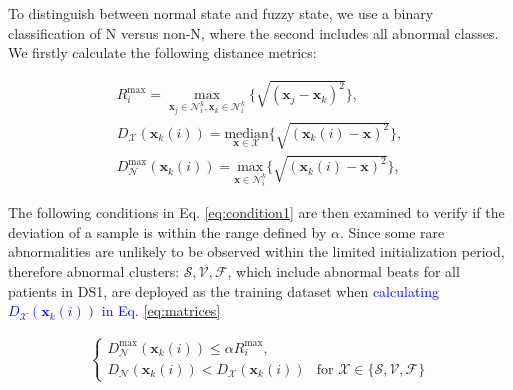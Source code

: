 To distinguish between normal state and fuzzy state, we use a binary classification of N versus non-N, where the second includes all abnormal classes. We firstly calculate the following distance metrics:

\begin{align}
R_i^{\max}=\underset{\mathbf{x}_j\in\mathcal{N}_i^k,\mathbf{x}_k\in\mathcal{N}_i^k}{\max}\{\sqrt{(\mathbf{x}_j-\mathbf{x}_k)^2}\},\\
\label{eq:matrices}
D_\mathcal{X}(\mathbf{x}_k(i))=\underset{\mathbf{x} \in\mathcal{X}}{\text{median}}\{\sqrt{(\mathbf{x}_k(i)-\mathbf{x})^2}\},
\\
D_\mathcal{N}^{\max}(\mathbf{x}_k(i))=\underset{\mathbf{x} \in\mathcal{N}_i^k}{\text{max}}\{\sqrt{(\mathbf{x}_k(i)-\mathbf{x})^2}\},
\end{align}

The following conditions in Eq. \ref{eq:condition1} are then examined to verify if the deviation of a sample is within the range defined by $\alpha$. Since some rare abnormalities are unlikely to be observed within the limited initialization period, therefore abnormal clusters: ${\mathcal{S},\mathcal{V},\mathcal{F}}$, which include abnormal beats for all patients in DS1, are deployed as the training dataset when \textcolor{blue}{calculating $D_\mathcal{X}(\mathbf{x}_k(i))$ in Eq. \ref{eq:matrices}} %

\begin{align}\label{eq:condition1}
\begin{cases}
D_\mathcal{N}^{\max}(\mathbf{x}_k(i))  \leq\alpha R_i^{\max},\\
D_\mathcal{N}(\mathbf{x}_k(i)) < D_\mathcal{X}(\mathbf{x}_k(i)) &\text{for~} \mathcal{X}\in\{\mathcal{S},\mathcal{V},\mathcal{F}\}   %
\end{cases}
\end{align}

